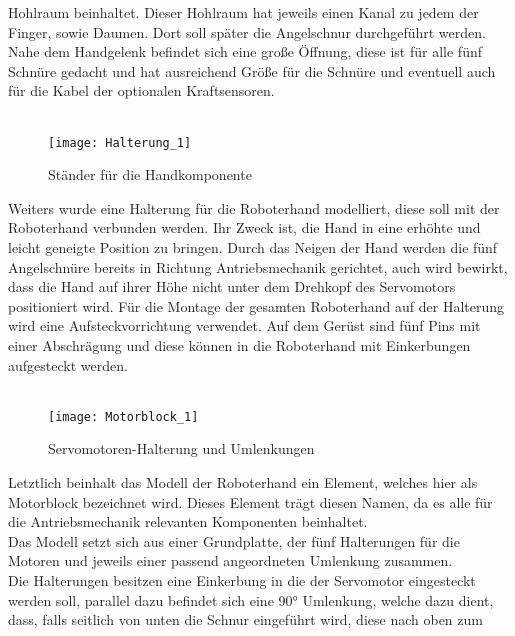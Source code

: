 \documentclass[titlepage,12pt,twoside]{article}
\begin{document}
Hohlraum beinhaltet. Dieser Hohlraum hat jeweils einen Kanal zu jedem der Finger, 
sowie Daumen. Dort soll später die Angelschnur durchgeführt werden. Nahe dem 
Handgelenk befindet sich eine große Öffnung, diese ist für alle fünf Schnüre 
gedacht und hat ausreichend Größe für die Schnüre und eventuell auch für die Kabel der 
optionalen Kraftsensoren. \\
\\
\begin{figure}[H]
	\begin{center}
		\scalebox{0.8}
		{\texttt{[image: Halterung\_1]}}
		\caption{Ständer für die Handkomponente}
		\label{fig:Halterung_1}		
	\end{center}
\end{figure}
\hfill \break
Weiters wurde eine Halterung für die Roboterhand modelliert, diese soll mit 
der Roboterhand verbunden werden. Ihr Zweck ist, die Hand in eine erhöhte und 
leicht geneigte Position zu bringen. Durch das Neigen der Hand werden die fünf 
Angelschnüre bereits in Richtung Antriebsmechanik gerichtet, auch wird bewirkt, 
dass die Hand auf ihrer Höhe nicht unter dem Drehkopf des Servomotors positioniert 
wird. Für die Montage der gesamten Roboterhand auf der Halterung wird eine 
Aufsteckvorrichtung verwendet. Auf dem Gerüst sind fünf Pins mit einer 
Abschrägung und diese können in die Roboterhand mit Einkerbungen aufgesteckt 
werden. \\
\\
\begin{figure}[H]
	\begin{center}
		\scalebox{0.8}
		{\texttt{[image: Motorblock\_1]}}
		\caption{Servomotoren-Halterung und Umlenkungen}
		\label{fig:Motorblock_1}			
	\end{center}
\end{figure}
\hfill \break
Letztlich beinhalt das Modell der Roboterhand ein Element, welches hier als 
Motorblock bezeichnet wird. Dieses Element trägt diesen Namen, da es alle 
für die Antriebsmechanik relevanten Komponenten beinhaltet. \\
Das Modell setzt sich aus einer Grundplatte, der fünf Halterungen für die 
Motoren und jeweils einer passend angeordneten Umlenkung zusammen. \\
Die Halterungen besitzen eine Einkerbung in die der Servomotor eingesteckt 
werden soll, parallel dazu befindet sich eine 90° Umlenkung, welche dazu dient, 
dass, falls seitlich von unten die Schnur eingeführt wird, diese nach oben zum 
\end{document}
